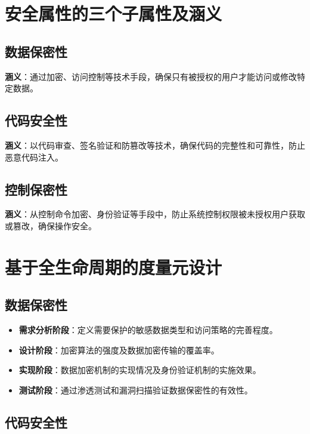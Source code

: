 \section{安全属性的三个子属性及涵义}

\subsection{数据保密性\cite{chowdhury2008security}}

\textbf{涵义}：通过加密、访问控制等技术手段，确保只有被授权的用户才能访问或修改特定数据。

\subsection{代码安全性}

\textbf{涵义}：以代码审查、签名验证和防篡改等技术，确保代码的完整性和可靠性，防止恶意代码注入。

\subsection{控制保密性}

\textbf{涵义}：从控制命令加密、身份验证等手段中，防止系统控制权限被未授权用户获取或篡改，确保操作安全。

\section{基于全生命周期的度量元设计}

\subsection{数据保密性}

\begin{itemize}
    \item \textbf{需求分析阶段}：定义需要保护的敏感数据类型和访问策略的完善程度。
    \item \textbf{设计阶段}：加密算法的强度及数据加密传输的覆盖率。
    \item \textbf{实现阶段}：数据加密机制的实现情况及身份验证机制的实施效果。
    \item \textbf{测试阶段}：通过渗透测试和漏洞扫描验证数据保密性的有效性。
\end{itemize}

\subsection{代码安全性}

